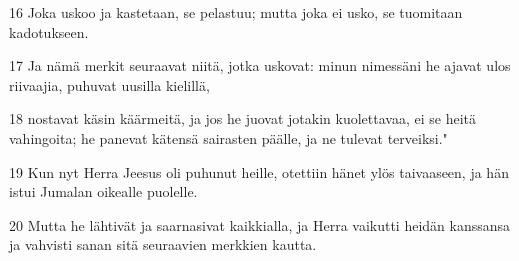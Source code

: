 \par 16 Joka uskoo ja kastetaan, se pelastuu; mutta joka ei usko, se tuomitaan kadotukseen.
\par 17 Ja nämä merkit seuraavat niitä, jotka uskovat: minun nimessäni he ajavat ulos riivaajia, puhuvat uusilla kielillä,
\par 18 nostavat käsin käärmeitä, ja jos he juovat jotakin kuolettavaa, ei se heitä vahingoita; he panevat kätensä sairasten päälle, ja ne tulevat terveiksi."
\par 19 Kun nyt Herra Jeesus oli puhunut heille, otettiin hänet ylös taivaaseen, ja hän istui Jumalan oikealle puolelle.
\par 20 Mutta he lähtivät ja saarnasivat kaikkialla, ja Herra vaikutti heidän kanssansa ja vahvisti sanan sitä seuraavien merkkien kautta.


